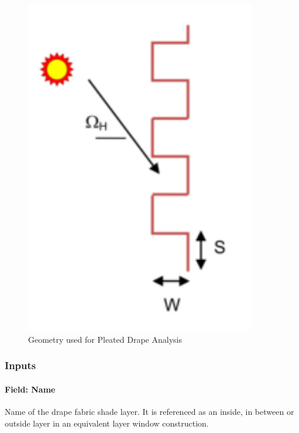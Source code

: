 \begin{figure}[hbtp] %
\centering
\includegraphics[width=0.9\textwidth, height=0.9\textheight, keepaspectratio=true]{media/image045.png}
\caption{Geometry used for Pleated Drape Analysis \protect \label{fig:geometry-used-for-pleated-drape-analysis}}
\end{figure}

\subsubsection{Inputs}\label{inputs-27-002}

\paragraph{Field: Name}\label{field-name-21-003}

Name of the drape fabric shade layer. It is referenced as an inside, in between or outside layer in an equivalent layer window construction.

